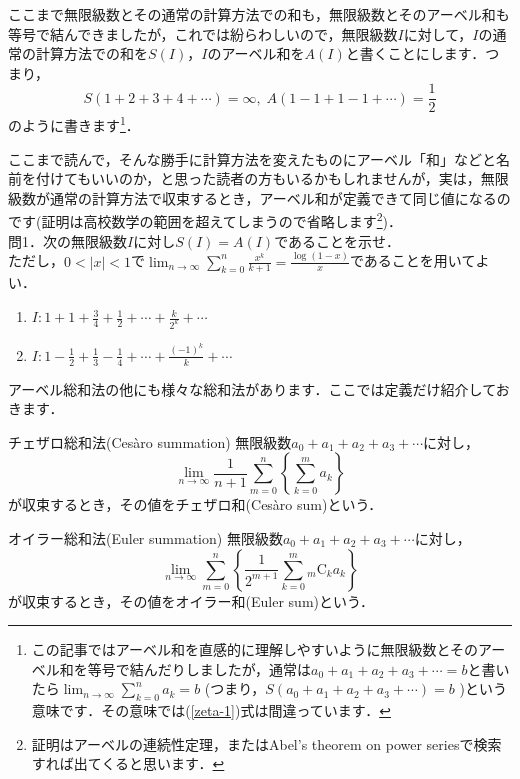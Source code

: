 \documentclass[./main]{subfile}
\begin{document}
ここまで無限級数とその通常の計算方法での和も，無限級数とそのアーベル和も等号で結んできましたが，これでは紛らわしいので，無限級数$I$に対して，$I$の通常の計算方法での和を$S(I)$，$I$のアーベル和を$A(I)$と書くことにします．つまり，
\[
S(1+2+3+4+\cdots)=\infty,\;A(1-1+1-1+\cdots)=\frac{1}{2}
\]
のように書きます\footnote{この記事ではアーベル和を直感的に理解しやすいように無限級数とそのアーベル和を等号で結んだりしましたが，通常は$a_0+a_1+a_2+a_3+\cdots=b$と書いたら$\lim_{n\to\infty}\sum_{k=0}^na_k=b$ (つまり，$S(a_0+a_1+a_2+a_3+\cdots)=b$ )という意味です．その意味では(\ref{zeta-1})式は間違っています．}．

ここまで読んで，そんな勝手に計算方法を変えたものにアーベル「和」などと名前を付けてもいいのか，と思った読者の方もいるかもしれませんが，実は，無限級数が通常の計算方法で収束するとき，アーベル和が定義できて同じ値になるのです(証明は高校数学の範囲を超えてしまうので省略します\footnote{証明はアーベルの連続性定理，またはAbel's theorem on power seriesで検索すれば出てくると思います．})．\vspace{1\baselineskip}\\
問1．次の無限級数$I$に対し$S(I)=A(I)$であることを示せ．\\
ただし，$0<|x|<1$で$\lim_{n\to\infty}\sum_{k=0}^n\frac{x^k}{k+1}=\frac{\log(1-x)}{x}$であることを用いてよい．
\begin{enumerate}%
\renewcommand{\labelenumi}{(\arabic{enumi})}%
\item $I:1+1+\frac{3}{4}+\frac{1}{2}+\cdots+\frac{k}{2^k}+\cdots$
\item $I:1-\frac{1}{2}+\frac{1}{3}-\frac{1}{4}+\cdots+\frac{(-1)^k}{k}+\cdots$
\end{enumerate}\vspace{1\baselineskip}

アーベル総和法の他にも様々な総和法があります．ここでは定義だけ紹介しておきます．
\begin{itembox}[l]{チェザロ\footnotemark{}総和法(Ces\`aro summation)}
無限級数$a_0+a_1+a_2+a_3+\cdots$に対し，
\[
\lim_{n\to\infty}\frac{1}{n+1}\sum_{m=0}^n\left\{\sum_{k=0}^ma_k\right\}
\]
が収束するとき，その値をチェザロ和(Ces\`aro sum)という．
\end{itembox}
\addtocounter{footnote}{-1}
\begin{itembox}[l]{オイラー\footnotemark{}総和法(Euler summation)}
無限級数$a_0+a_1+a_2+a_3+\cdots$に対し，
\[
\lim_{n\to\infty}\sum_{m=0}^n\left\{\frac{1}{2^{m+1}}\sum_{k=0}^m{}_m\mathrm{C}_ka_k\right\}
\]
が収束するとき，その値をオイラー和(Euler sum)という．
\end{itembox}
\addtocounter{footnote}{-1}
\end{document}
